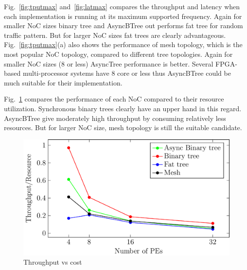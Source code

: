 Fig.~\ref{fig:tputmax} and~\ref{fig:latmax} compares the throughput and latency when each implementation is running at its maximum supported frequency.
Again for smaller NoC sizes binary tree and AsyncBTree out performs fat tree for random traffic pattern.
But for larger NoC sizes fat trees are clearly advantageous.
Fig.~\ref{fig:tputmax}(a) also shows the performance of mesh topology, which is the most popular NoC topology, compared to different tree topologies.
Again for smaller NoC sizes (8 or less) AsyncTree performance is better.
Several FPGA-based multi-processor systems have 8 core or less thus AsyncBTree could be much suitable for their implementation.

Fig.~\ref{fig:tputPerf} compares the performance of each NoC compared to their resource utilization.
Synchronous binary trees clearly have an upper hand in this regard.
AsyncBTree give moderately high throughput by consuming relatively less resources.
But for larger NoC size, mesh topology is still the suitable candidate.


\begin{figure}[t]
\centering
   \includegraphics[width=0.6\columnwidth]{Data/tputVsCost.pdf}
         \vspace{-2mm}
   \caption{Throughput vs cost}
      \vspace{-5mm}
      \label{fig:tputPerf}
\end{figure}
